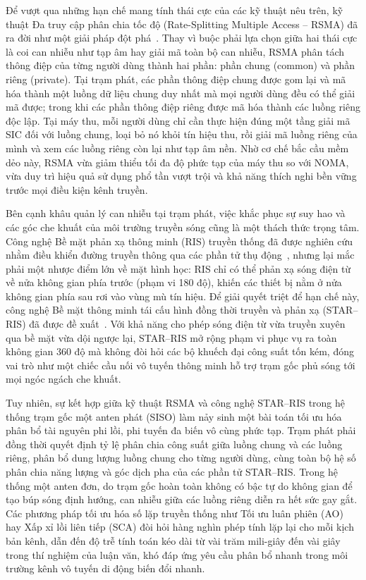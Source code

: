 Để vượt qua những hạn chế mang tính thái cực của các kỹ thuật nêu trên, kỹ thuật Đa truy cập phân chia
tốc độ (Rate-Splitting Multiple Access -- RSMA) đã ra đời như một giải pháp đột
phá~\cite{Mao2018RSMABridging, Mao2022RSMAFundamentals}. Thay vì buộc phải lựa chọn giữa hai thái cực
là coi can nhiễu như tạp âm hay giải mã toàn bộ can nhiễu, RSMA phân tách thông điệp của từng người dùng
thành hai phần: phần chung (common) và phần riêng (private). Tại trạm phát, các phần thông điệp chung
được gom lại và mã hóa thành một luồng dữ liệu chung duy nhất mà mọi người dùng đều có thể giải mã được;
trong khi các phần thông điệp riêng được mã hóa thành các luồng riêng độc lập. Tại máy thu, mỗi người
dùng chỉ cần thực hiện đúng một tầng giải mã SIC đối với luồng chung, loại bỏ nó khỏi tín hiệu thu, rồi
giải mã luồng riêng của mình và xem các luồng riêng còn lại như tạp âm nền. Nhờ cơ chế bắc cầu mềm dẻo
này, RSMA vừa giảm thiểu tối đa độ phức tạp của máy thu so với NOMA, vừa duy trì hiệu quả sử dụng phổ
tần vượt trội và khả năng thích nghi bền vững trước mọi điều kiện kênh truyền.

Bên cạnh khâu quản lý can nhiễu tại trạm phát, việc khắc phục sự suy hao và các góc che khuất của môi
trường truyền sóng cũng là một thách thức trọng tâm. Công nghệ Bề mặt phản xạ thông minh (RIS) truyền
thống đã được nghiên cứu nhằm điều khiển đường truyền thông qua các phần tử thụ
động~\cite{Wu2019IRSBeamforming, DiRenzo2020SmartRadio}, nhưng lại mắc phải một nhược điểm lớn về mặt
hình học: RIS chỉ có thể phản xạ sóng điện từ về nửa không gian phía trước (phạm vi 180 độ), khiến các
thiết bị nằm ở nửa không gian phía sau rơi vào vùng mù tín hiệu. Để giải quyết triệt để hạn chế này,
công nghệ Bề mặt thông minh tái cấu hình đồng thời truyền và phản xạ (STAR--RIS) đã được đề
xuất~\cite{Xu2021STARRIS, Mu2021STARAided}. Với khả năng cho phép sóng điện từ vừa truyền xuyên qua bề
mặt vừa dội ngược lại, STAR--RIS mở rộng phạm vi phục vụ ra toàn không gian 360 độ mà không đòi hỏi các
bộ khuếch đại công suất tốn kém, đóng vai trò như một chiếc cầu nối vô tuyến thông minh hỗ trợ trạm gốc
phủ sóng tới mọi ngóc ngách che khuất.

Tuy nhiên, sự kết hợp giữa kỹ thuật RSMA và công nghệ STAR--RIS trong hệ thống trạm gốc một anten phát
(SISO) làm nảy sinh một bài toán tối ưu hóa phân bổ tài nguyên phi lồi, phi tuyến đa biến vô cùng phức
tạp. Trạm phát phải đồng thời quyết định tỷ lệ phân chia công suất giữa luồng chung và các luồng riêng,
phân bổ dung lượng luồng chung cho từng người dùng, cùng toàn bộ hệ số phân chia năng lượng và góc dịch
pha của các phần tử STAR--RIS. Trong hệ thống một anten đơn, do trạm gốc hoàn toàn không có bậc tự do
không gian để tạo búp sóng định hướng, can nhiễu giữa các luồng riêng diễn ra hết sức gay gắt. Các
phương pháp tối ưu hóa số lặp truyền thống như Tối ưu luân phiên (AO) hay Xấp xỉ lồi liên tiếp (SCA)
đòi hỏi hàng nghìn phép tính lặp lại cho mỗi kịch bản kênh, dẫn đến độ trễ tính toán kéo dài từ vài
trăm mili-giây đến vài giây trong thí nghiệm của luận văn, khó đáp ứng yêu cầu phân bổ nhanh trong môi
trường kênh vô tuyến di động biến đổi nhanh.

